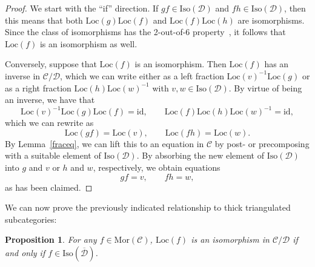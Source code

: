\documentclass{amsproc}
\newtheorem{prop}{Proposition}[section]
\theoremstyle{definition}
\begin{document}
\begin{proof}
We start with the ``if'' direction. If $gf\in{\mathrm{Iso}}({\mathcal{D}})$ and $fh\in{\mathrm{Iso}}({\mathcal{D}})$, then this means that both ${\mathrm{Loc}}(g){\mathrm{Loc}}(f)$ and ${\mathrm{Loc}}(f){\mathrm{Loc}}(h)$ are isomorphisms. Since the class of isomorphisms has the 2-out-of-6 property~\cite{DHK}, it follows that ${\mathrm{Loc}}(f)$ is an isomorphism as well.

Conversely, suppose that ${\mathrm{Loc}}(f)$ is an isomorphism. Then ${\mathrm{Loc}}(f)$ has an inverse in ${\mathcal{C}}/{\mathcal{D}}$, which we can write either as a left fraction ${\mathrm{Loc}}(v)^{-1}{\mathrm{Loc}}(g)$ or as a right fraction ${\mathrm{Loc}}(h){\mathrm{Loc}}(w)^{-1}$ with $v,w\in{\mathrm{Iso}}({\mathcal{D}})$. By virtue of being an inverse, we have that
\[
{\mathrm{Loc}}(v)^{-1}{\mathrm{Loc}}(g){\mathrm{Loc}}(f) = {\mathrm{id}},\qquad {\mathrm{Loc}}(f){\mathrm{Loc}}(h){\mathrm{Loc}}(w)^{-1} = {\mathrm{id}},
\]
which we can rewrite as
\[
{\mathrm{Loc}}(gf) = {\mathrm{Loc}}(v),\qquad {\mathrm{Loc}}(fh) = {\mathrm{Loc}}(w).
\]
By Lemma~\ref{fraceq}, we can lift this to an equation in ${\mathcal{C}}$ by post- or precomposing with a suitable element of ${\mathrm{Iso}}({\mathcal{D}})$. By absorbing the new element of ${\mathrm{Iso}}({\mathcal{D}})$ into $g$ and $v$ or $h$ and $w$, respectively, we obtain equations
\[
gf = v,\qquad fh = w,
\]
as has been claimed.
\end{proof}

We can now prove the previously indicated relationship to thick triangulated subcategories:

\begin{prop}
\label{isocrit2}
For any $f\in{\mathrm{Mor}}({\mathcal{C}})$, ${\mathrm{Loc}}(f)$ is an isomorphism in ${\mathcal{C}}/{\mathcal{D}}$ if and only if $f\in{\mathrm{Iso}}(\overline{\mathcal{D}})$.
\end{prop}
\end{document}
